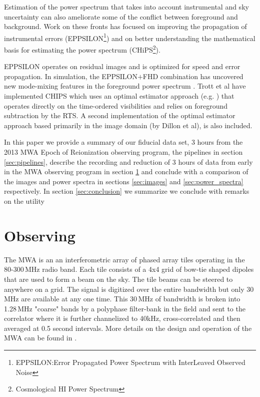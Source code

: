 \documentclass[preprint2]{aastex}
\begin{document}
 Estimation of the power spectrum that takes into account instrumental and sky uncertainty can also ameliorate some of the conflict between foreground and background.  Work on these fronts has focused on improving the propagation of instrumental errors (EPPSILON\footnote{EPPSILON:Error Propagated Power Spectrum with InterLeaved Observed Noise}) and on better understanding the mathematical basis for estimating the power spectrum (CHiPS\footnote{Cosmological HI Power Spectrum}).  
 
 EPPSILON operates on residual images and is optimized for speed and error propagation. In simulation, the EPPSILON$+$FHD combination has uncovered new mode-mixing features in the foreground power spectrum \citep{Morales:2012p8790}.  Trott et al have implemented CHIPS which uses an optimal estimator approach (e.g. \cite{Liu:2011p8763})  that operates directly on the time-ordered visibilities and relies on foreground subtraction by the RTS.  A second implementation of the optimal estimator approach based primarily in the image domain (by Dillon et al), is also included.


In this paper we provide a summary of our fiducial data set, 3 hours from the 2013 MWA Epoch of Reionization observing program, the pipelines in section \ref{sec:pipelines}, describe the recording and reduction of 3 hours of data from early in the MWA observing program in section \ref{sec:observing} and conclude with a comparison of the images and power spectra in sections \ref{sec:images} and \ref{sec:power_spectra} respectively. In section \ref{sec:conclusion} we summarize we conclude with remarks on the utility


\section{Observing}
\label{sec:observing}
The MWA is an an interferometric array of phased array tiles operating in the 80-300\,MHz radio band. Each tile consists of a 4x4 grid of bow-tie shaped dipoles that are used to form a beam on the sky.  The tile beams can be steered to anywhere on a grid.  The signal is digitized over the entire bandwidth but only 30\,MHz are available at any one time.  This 30\,MHz of bandwidth is broken into 1.28\,MHz "coarse" bands by a polyphase filter-bank in the field and sent to the correlator where it is further channelized to 40kHz, cross-correlated and then averaged at 0.5 second intervals.  More details on the design and operation of the MWA can be found in \cite{Tingay:2013p9022}.
\end{document}
